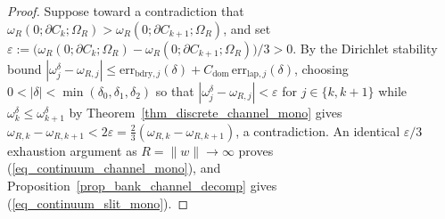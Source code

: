 \documentclass[11pt,reqno]{amsart}
\numberwithin{equation}{section}
\newcommand{\eps}{\varepsilon}
\begin{document}
\begin{proof}
Suppose toward a contradiction that $\omega_R(0; \partial C_k; \varOmega_R) > \omega_R(0; \partial C_{k+1}; \varOmega_R)$, and set $\eps := \bigl(\omega_R(0; \partial C_k; \varOmega_R) - \omega_R(0; \partial C_{k+1}; \varOmega_R)\bigr)/3 > 0$. By the Dirichlet stability bound $|\omega^{\delta}_j - \omega_{R,j}| \le \text{err}_{\text{bdry},j}(\delta) + C_{\text{dom}}\,\text{err}_{\text{lap},j}(\delta)$, choosing $0 < |\delta| < \min(\delta_0, \delta_1, \delta_2)$ so that $|\omega^{\delta}_j - \omega_{R,j}| < \eps$ for $j \in \{k, k+1\}$ while $\omega^{\delta}_k \le \omega^{\delta}_{k+1}$ by Theorem~\ref{thm_discrete_channel_mono} gives $\omega_{R,k} - \omega_{R,k+1} < 2\eps = \frac{2}{3}(\omega_{R,k} - \omega_{R,k+1})$, a contradiction. An identical $\eps/3$ exhaustion argument as $R = \|w\| \to \infty$ proves (\ref{eq_continuum_channel_mono}), and Proposition~\ref{prop_bank_channel_decomp} gives (\ref{eq_continuum_slit_mono}).
\end{proof}
\end{document}
